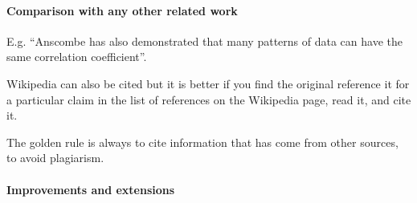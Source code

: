 \begin{multicols}{2}
        \paragraph{Comparison with any other related work}
            E.g. ``Anscombe has also demonstrated that many patterns of data can have the
                same correlation coefficient''.

            Wikipedia can also be cited but it is better if you find the original reference
                it for a particular claim in the list of references on the Wikipedia page, read
                it, and cite it.

            The golden rule is always to cite information that has come from other sources,
                to avoid plagiarism.

        \paragraph{Improvements and extensions}


    \end{multicols}